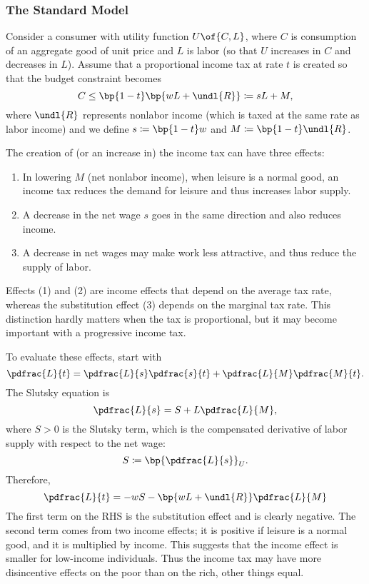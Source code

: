 \subsubsection{The Standard Model}

Consider a consumer with utility function $U\of{C, L}$, where $C$ is consumption of an aggregate good of unit price and $L$ is labor (so that $U$ increases in $C$ and decreases in $L$). Assume that a proportional income tax at rate $t$ is created so that the budget constraint becomes 
\begin{equation}
    \notag 
    C \leq \bp{1-t} \bp{w L + \undl{R}} \coloneqq s L + M,
\end{equation}
where $\undl{R}$ represents nonlabor income (which is taxed at the same rate as labor income) and we define $s \coloneqq \bp{1-t}w$ and $M \coloneqq \bp{1-t} \undl{R}$.

The creation of (or an increase in) the income tax can have three effects:
\begin{enumerate}[topsep=0pt, leftmargin=20pt, itemsep=0pt, label=(\arabic*)]
	\setlength{\parskip}{10pt} 
	\item In lowering $M$ (net nonlabor income), when leisure is a normal good, an income tax reduces the demand for leisure and thus increases labor supply.
	\item A decrease in the net wage $s$ goes in the same direction and also reduces income.
	\item A decrease in net wages may make work less attractive, and thus reduce the supply of labor.
\end{enumerate}

Effects (1) and (2) are income effects that depend on the average tax rate, whereas the substitution effect (3) depends on the marginal tax rate. This distinction hardly matters when the tax is proportional, but it may become important with a progressive income tax.

To evaluate these effects, start with 
\begin{equation}
    \notag 
    \pdfrac{L}{t} = \pdfrac{L}{s} \pdfrac{s}{t} + \pdfrac{L}{M} \pdfrac{M}{t}.
\end{equation}
The Slutsky equation is 
\begin{equation}
    \notag 
    \pdfrac{L}{s} = S + L \pdfrac{L}{M},
\end{equation}
where $S > 0$ is the Slutsky term, which is the compensated derivative of labor supply with respect to the net wage:
\begin{equation}
    \notag 
    S \coloneqq \bp{\pdfrac{L}{s}}_{U}.
\end{equation}
Therefore, 
\begin{equation}
    \notag 
    \pdfrac{L}{t} = -w S - \bp{wL + \undl{R}} \pdfrac{L}{M}
\end{equation}
The first term on the RHS is the substitution effect and is clearly negative. The second term comes from two income effects; it is positive if leisure is a normal good, and it is multiplied by income. This suggests that the income effect is smaller for low-income individuals. Thus the income tax may have more disincentive effects on the poor than on the rich, other things equal.

